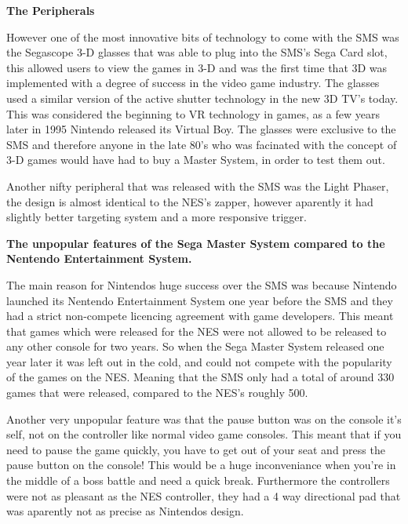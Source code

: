 \documentclass{scrartcl}
\begin{document}
\textbf{The Peripherals} \par

However one of the most innovative bits of technology to come with the SMS was the Segascope 3-D glasses that was able to plug into the SMS's Sega Card slot, this allowed users to view the games in 3-D and was the first time that 3D was implemented with a degree of success in the video game industry. The glasses used a similar version of the active shutter technology in the new 3D TV's today.\cite{SegaScopeTech} This was considered the beginning to VR technology in games, as a few years later in 1995 Nintendo released its Virtual Boy. \cite{Workman} The glasses were exclusive to the SMS and therefore anyone in the late 80's who was facinated with the concept of 3-D games would have had to buy a Master System, in order to test them out.

Another nifty peripheral that was released with the SMS was the Light Phaser, the design is almost identical to the NES's zapper, however aparently it had slightly better targeting system and a more responsive trigger. 


\textbf{The unpopular features of the Sega Master System compared to the Nentendo Entertainment System.} \par

The main reason for Nintendos huge success over the SMS was because Nintendo launched its Nentendo Entertainment System one year before the SMS and they had a strict non-compete licencing agreement with game developers. This meant that games which were released for the NES were not allowed to be released to any other console for two years.\cite{Weiss2009} So when the Sega Master System released one year later it was left out in the cold, and could not compete with the popularity of the games on the NES. Meaning that the SMS only had a total of around 330 games that were released, compared to the NES's roughly 500. \cite{russell}

Another very unpopular feature was that the pause button was on the console it's self, not on the controller like normal video game consoles. This meant that if you need to pause the game quickly, you have to get out of your seat and press the pause button on the console! This would be a huge inconveniance when you're in the middle of a boss battle and need a quick break. Furthermore the controllers were not as pleasant as the NES controller, they had a 4 way directional pad that was aparently not as precise as Nintendos design.\cite{Weiss2009}
\end{document}

